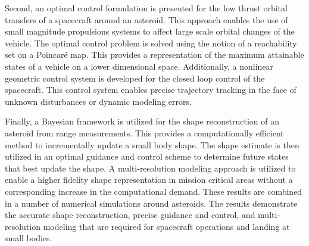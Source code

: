 \documentclass{article}
\newcommand{\Poincare}{Poincar\'e }
\begin{document}
Second, an optimal control formulation is presented for the low thrust orbital transfers of a spacecraft around an asteroid. 
This approach enables the use of small magnitude propulsions systems to affect large scale orbital changes of the vehicle. 
The optimal control problem is solved using the notion of a reachability set on a \Poincare map.
This provides a representation of the maximum attainable states of a vehicle on a lower dimensional space.
Additionally, a nonlinear geometric control system is developed for the closed loop control of the spacecraft.
This control system enables precise trajectory tracking in the face of unknown disturbances or dynamic modeling errors. 

Finally, a Bayesian framework is utilized for the shape reconstruction of an asteroid from range measurements. 
This provides a computationally efficient method to incrementally update a small body shape. 
The shape estimate is then utilized in an optimal guidance and control scheme to determine future states that best update the shape.
A multi-resolution modeling approach is utilized to enable a higher fidelity shape representation in mission critical areas without a corresponding increase in the computational demand.
These results are combined in a number of numerical simulations around asteroids.
The results demonstrate the accurate shape reconstruction, precise guidance and control, and multi-resolution modeling that are required for spacecraft operations and landing at small bodies.
\end{document}
